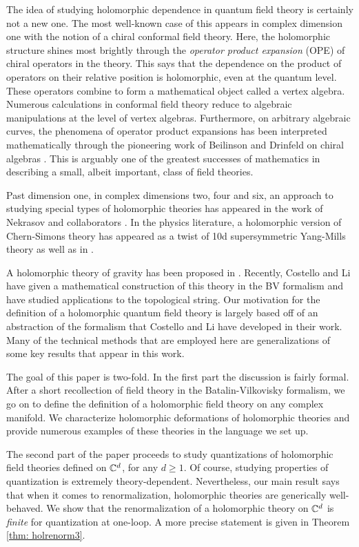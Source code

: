 \documentclass[10pt]{amsart}
\begin{document}
The idea of studying holomorphic dependence in quantum field theory is certainly not a new one.
The most well-known case of this appears in complex dimension one with the notion of a chiral conformal field theory.
Here, the holomorphic structure shines most brightly through the {\em operator product expansion} (OPE) of chiral operators in the theory. 
This says that the dependence on the product of operators on their relative position is holomorphic, even at the quantum level. 
These operators combine to form a mathematical object called a vertex algebra.
Numerous calculations in conformal field theory reduce to algebraic manipulations at the level of vertex algebras. 
Furthermore, on arbitrary algebraic curves, the phenomena of operator product expansions has been interpreted mathematically through the pioneering work of Beilinson and Drinfeld on chiral algebras \cite{BD}. 
This is arguably one of the greatest successes of mathematics in describing a small, albeit important, class of field theories. 

Past dimension one, in complex dimensions two, four and six, an approach to studying special types of holomorphic theories has appeared in the work of Nekrasov and collaborators \cite{NekThesis, NekChiral, NekCFT}. 
In the physics literature, a holomorphic version of Chern-Simons theory has appeared as a twist of 10d supersymmetric Yang-Mills theory \cite{Baulieu} as well as in \cite{Popov1, Popov2}.

A holomorphic theory of gravity has been proposed in \cite{BCOVafa}.
Recently, Costello and Li \cite{bcov, CL1,CosKos1, CosM} have given a mathematical construction of this theory in the BV formalism and have studied applications to the topological string.
Our motivation for the definition of a holomorphic quantum field theory is largely based off of an abstraction of the formalism that Costello and Li have developed in their work. 
Many of the technical methods that are employed here are generalizations of some key results that appear in this work. 

The goal of this paper is two-fold. 
In the first part the discussion is fairly formal.
After a short recollection of field theory in the Batalin-Vilkovisky formalism, we go on to define the definition of a holomorphic field theory on any complex manifold. 
We characterize holomorphic deformations of holomorphic theories and provide numerous examples of these theories in the language we set up.

The second part of the paper proceeds to study quantizations of holomorphic field theories defined on $\mathbb C^d$, for any $d \geq 1$. 
Of course, studying properties of quantization is extremely theory-dependent.
Nevertheless, our main result says that when it comes to renormalization, holomorphic theories are generically well-behaved.
We show that the renormalization of a holomorphic theory on $\mathbb C^d$ is {\em finite} for quantization at one-loop.
A more precise statement is given in Theorem \ref{thm: holrenorm3}. 
 
\end{document}
